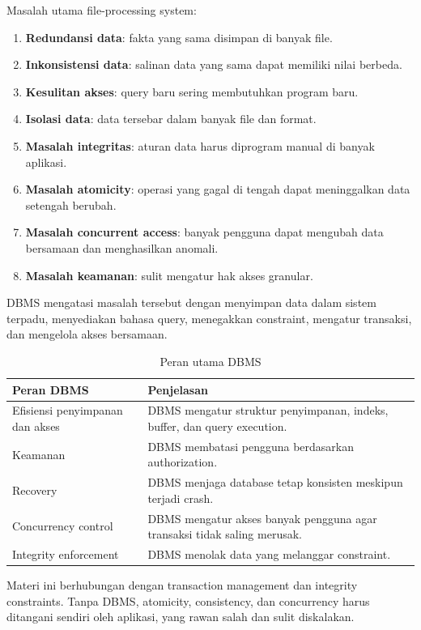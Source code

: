 Masalah utama file-processing system:
\begin{enumerate}
    \item \textbf{Redundansi data}: fakta yang sama disimpan di banyak file.
    \item \textbf{Inkonsistensi data}: salinan data yang sama dapat memiliki nilai berbeda.
    \item \textbf{Kesulitan akses}: query baru sering membutuhkan program baru.
    \item \textbf{Isolasi data}: data tersebar dalam banyak file dan format.
    \item \textbf{Masalah integritas}: aturan data harus diprogram manual di banyak aplikasi.
    \item \textbf{Masalah atomicity}: operasi yang gagal di tengah dapat meninggalkan data setengah berubah.
    \item \textbf{Masalah concurrent access}: banyak pengguna dapat mengubah data bersamaan dan menghasilkan anomali.
    \item \textbf{Masalah keamanan}: sulit mengatur hak akses granular.
\end{enumerate}

DBMS mengatasi masalah tersebut dengan menyimpan data dalam sistem terpadu, menyediakan bahasa query, menegakkan constraint, mengatur transaksi, dan mengelola akses bersamaan.

\begin{table}[H]
\centering
\begin{tabularx}{\textwidth}{|L{0.26\textwidth}|X|}
\hline
\textbf{Peran DBMS} & \textbf{Penjelasan} \\
\hline
Efisiensi penyimpanan dan akses & DBMS mengatur struktur penyimpanan, indeks, buffer, dan query execution. \\
\hline
Keamanan & DBMS membatasi pengguna berdasarkan authorization. \\
\hline
Recovery & DBMS menjaga database tetap konsisten meskipun terjadi crash. \\
\hline
Concurrency control & DBMS mengatur akses banyak pengguna agar transaksi tidak saling merusak. \\
\hline
Integrity enforcement & DBMS menolak data yang melanggar constraint. \\
\hline
\end{tabularx}
\caption{Peran utama DBMS}
\label{tab:peran-dbms}
\end{table}

Materi ini berhubungan dengan transaction management dan integrity constraints. Tanpa DBMS, atomicity, consistency, dan concurrency harus ditangani sendiri oleh aplikasi, yang rawan salah dan sulit diskalakan.

